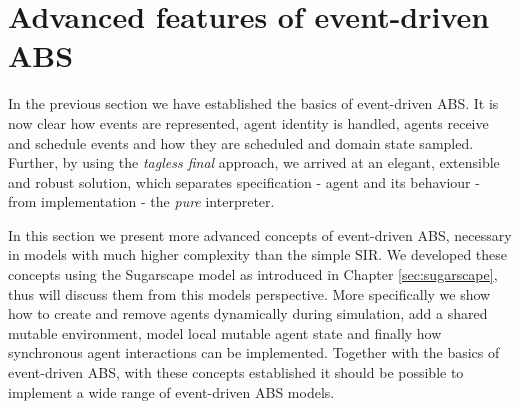 \section{Advanced features of event-driven ABS}
\label{sec:advanced_eventdriven_ABS}

In the previous section we have established the basics of event-driven ABS. It is now clear how events are represented, agent identity is handled, agents receive and schedule events and how they are scheduled and domain state sampled. Further, by using the \textit{tagless final} approach, we arrived at an elegant, extensible and robust solution, which separates specification - agent and its behaviour - from implementation - the \textit{pure} interpreter. 

In this section we present more advanced concepts of event-driven ABS, necessary in models with much higher complexity than the simple SIR. We developed these concepts using the Sugarscape model as introduced in Chapter \ref{sec:sugarscape}, thus will discuss them from this models perspective. More specifically we show how to create and remove agents dynamically during simulation, add a shared mutable environment, model local mutable agent state and finally how synchronous agent interactions can be implemented. Together with the basics of event-driven ABS, with these concepts established it should be possible to implement a wide range of event-driven ABS models.









